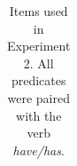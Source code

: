 \documentclass[floatsintext,doc]{apa6}
\begin{document}
\begin{longtable}{ |p{3in}| |p{2 in}|}
\caption{Items used in Experiment 2. All predicates were paired with the verb \emph{have/has}.} 
\end{longtable}

\endgroup




\newpage
\end{document}
